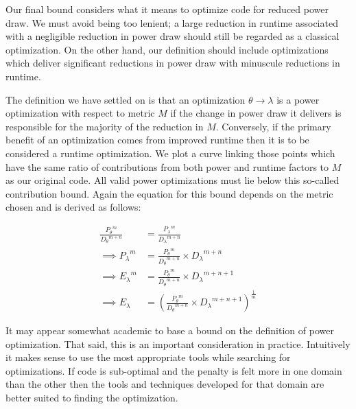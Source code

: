 Our final bound considers what it means to optimize code for reduced power draw. We must avoid being too lenient; a large reduction in runtime associated with a negligible reduction in power draw should still be regarded as a classical optimization. On the other hand, our definition should include optimizations which deliver significant reductions in power draw with minuscule reductions in runtime. 

The definition we have settled on is that an optimization $\theta \to \lambda$ is a power optimization with respect to metric $M$ if the change in power draw it delivers is responsible for the majority of the reduction in $M$. Conversely, if the primary benefit of an optimization comes from improved runtime then it is to be considered a runtime optimization. We plot a curve linking those points which have the same ratio of contributions from both power and runtime factors to $M$ as our original code. All valid power optimizations must lie below this so-called contribution bound. Again the equation for this bound depends on the metric chosen and is derived as follows:

\begin{align}
\frac{{P_{\theta}}^m}{{D_{\theta}}^{m+n}} &= \frac{{P_{\lambda}}^m}{{D_{\lambda}}^{m+n}} \nonumber \\
\implies {P_{\lambda}}^m &= \frac{{P_{\theta}}^m}{{D_{\theta}}^{m+n}} \times {D_\lambda}^{m+n} \nonumber \\ 
\implies {E_{\lambda}}^m &= \frac{{P_{\theta}}^m}{{D_{\theta}}^{m+n}} \times {D_\lambda}^{m+n+1} \nonumber \\ 
\implies E_{\lambda} &= (\frac{{P_{\theta}}^m}{{D_{\theta}}^{m+n}} \times {D_\lambda}^{m+n+1})^{\frac{1}{m}} 
\end{align}






It may appear somewhat academic to base a bound on the definition of power optimization. That said, this is an important consideration in practice. Intuitively it makes sense to use the most appropriate tools while searching for optimizations. If code is sub-optimal and the penalty is felt more in one domain than the other then the tools and techniques developed for that domain are better suited to finding the optimization.


